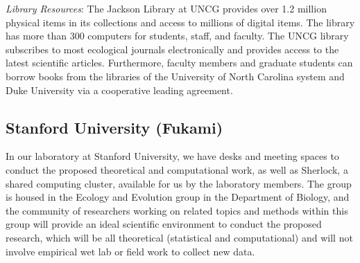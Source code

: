 \documentclass[12pt, class=article, crop=false]{standalone}
\begin{document}
\textit{Library Resources}: The Jackson Library at UNCG provides over 1.2 million physical items in its collections and access to millions of digital items. The library has more than 300 computers for students, staff, and faculty. The UNCG library subscribes to most ecological journals electronically and provides access to the latest scientific articles.
Furthermore, faculty members and graduate students can borrow books from the libraries of the University of North Carolina system and Duke University via a cooperative leading agreement.

\subsection*{Stanford University (Fukami)}

In our laboratory at Stanford University, we have desks and meeting spaces to conduct the proposed theoretical and computational work, as well as Sherlock, a shared computing cluster, available for us by the laboratory members. The group is housed in the Ecology and Evolution group in the Department of Biology, and the community of researchers working on related topics and methods within this group will provide an ideal scientific environment to conduct the proposed research, which will be all theoretical (statistical and computational) and will not involve empirical wet lab or field work to collect new data.
\end{document}
